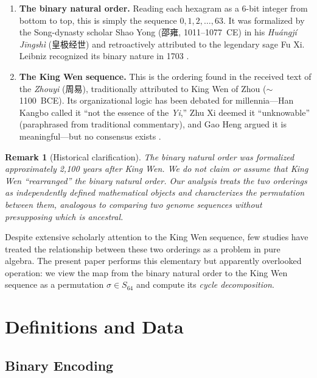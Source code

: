 \documentclass[11pt,a4paper]{article}
\newtheorem{remark}{Remark}
\begin{document}
\begin{enumerate}[label=(\roman*)]
  \item \textbf{The binary natural order.}
  Reading each hexagram as a 6-bit integer from bottom to top, this is simply the sequence $0, 1, 2, \ldots, 63$.
  It was formalized by the Song-dynasty scholar Shao Yong (邵雍, 1011--1077~CE) in his \textit{Huángjí Jīngshì} (皇极经世) and retroactively attributed to the legendary sage Fu Xi.
  Leibniz recognized its binary nature in 1703 \citep{leibniz1703}.

  \item \textbf{The King Wen sequence.}
  This is the ordering found in the received text of the \textit{Zhouyi} (周易), traditionally attributed to King Wen of Zhou ($\sim$1100~BCE).
  Its organizational logic has been debated for millennia---Han Kangbo called it ``not the essence of the \textit{Yi},'' Zhu Xi deemed it ``unknowable'' (paraphrased from traditional commentary), and Gao Heng argued it is meaningful---but no consensus exists \citep{rutt2002,shaughnessy2014}.
\end{enumerate}

\begin{remark}[Historical clarification]\label{rem:historical}
  The binary natural order was formalized approximately 2{,}100 years \emph{after} King Wen.
  We do not claim or assume that King Wen ``rearranged'' the binary natural order.
  Our analysis treats the two orderings as independently defined mathematical objects and characterizes the permutation between them, analogous to comparing two genome sequences without presupposing which is ancestral.
\end{remark}

Despite extensive scholarly attention to the King Wen sequence, few studies have treated the relationship between these two orderings as a problem in pure algebra.
The present paper performs this elementary but apparently overlooked operation: we view the map from the binary natural order to the King Wen sequence as a permutation $\sigma \in S_{64}$ and compute its \emph{cycle decomposition}.


\section{Definitions and Data}\label{sec:data}

\subsection{Binary Encoding}
\end{document}
